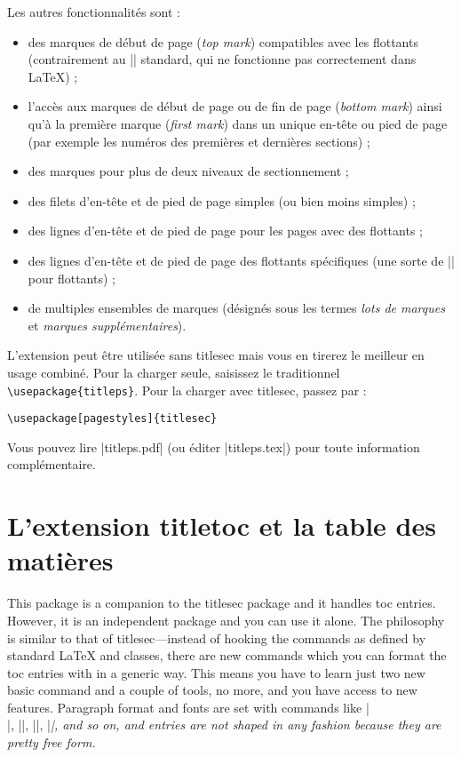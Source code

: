 \documentclass[a4paper]{ltxguide}
\newcommand{\tradini}{\color{orange5}\ding{54}}
\begin{document}
Les autres fonctionnalités sont :
\begin{itemize}
\item des marques de début de page (\emph{top mark}) compatibles avec les flottants 
(contrairement au |\topmark| standard, qui ne fonctionne pas correctement dans \LaTeX{}) ;
\item l'accès aux marques de début de page ou de fin de page (\emph{bottom mark}) ainsi 
qu'à la première marque (\emph{first mark}) dans un unique en-tête ou pied de page (par 
exemple les numéros des premières et dernières sections) ;
\item des marques pour plus de deux niveaux de sectionnement ;
\item des filets d'en-tête et de pied de page simples (ou bien moins simples) ;
\item des lignes d'en-tête et de pied de page pour les pages avec des flottants ;
\item des lignes d'en-tête et de pied de page des flottants spécifiques (une sorte 
de |\thispagestyle| pour flottants) ;
\item de multiples ensembles de marques (désignés sous les termes \emph{lots de marques
} et \textit{marques supplémentaires}).
\end{itemize}

L'extension peut être utilisée sans \textsf{titlesec} mais vous en tirerez le meilleur
en usage combiné. Pour la charger seule, saisissez le traditionnel 
\verb|\usepackage{titleps}|. Pour la charger avec \textsf{titlesec}, passez par :
\begin{verbatim}
\usepackage[pagestyles]{titlesec}
\end{verbatim}

Vous pouvez lire |titleps.pdf| (ou éditer |titleps.tex|) pour toute information
complémentaire.

\section{L'extension \textsf{titletoc} et la table des matières}

\tradini This package is a companion to the \textsf{titlesec} package and it 
handles
toc entries. However, it is an independent package and you can use
it alone. The philosophy is similar to that of \textsf{titlesec}---instead
of hooking the commands as defined by standard \LaTeX{} and classes,
there are new commands which you can format the toc entries with
in a generic way. This means you have to learn just
two new basic command and a couple of tools, no more, and you have access 
to
new features. Paragraph format
and fonts are set with commands like |\\|, 
|\makebox|,
|\large|, |\itshape|, and so on, and entries are not shaped in any
fashion because they are pretty free form.
\end{document}
